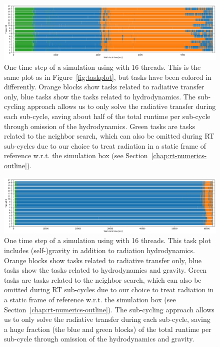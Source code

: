 \begin{figure}
 \centering
 \includegraphics[width=\textwidth]{figures/RHD/taskplot-rt-colored.png}%
 \caption{
One time step of a simulation using \swift with 16 threads. This is the same plot as in
Figure~\ref{fig:taskplot}, but tasks have been colored in differently. Orange blocks show tasks
related to radiative transfer only, blue tasks show the tasks related to hydrodynamics. The
sub-cycling approach allows us to only solve the radiative transfer during each sub-cycle, saving
about half of the total runtime per sub-cycle through omission of the hydrodynamics. Green tasks
are tasks related to the neighbor search, which can also be omitted during RT sub-cycles due to our
choice to treat radiation in a static frame of reference w.r.t. the simulation box (see
Section~\ref{chap:rt-numerics-outline}).
 }
 \label{fig:taskplot-rt-marked}
\end{figure}


\begin{figure}
 \centering
 \includegraphics[width=\textwidth]{figures/RHD/taskplot-rt-colored-gravity.png}%
 \caption{
One time step of a simulation using \swift with 16 threads. This task plot includes (self-)gravity
in addition to radiation hydrodynamics. Orange blocks show tasks related to radiative transfer
only, blue tasks show the tasks related to hydrodynamics and gravity. Green tasks are tasks related
to the neighbor search, which can also be omitted during RT sub-cycles due to our choice to treat
radiation in a static frame of reference w.r.t. the simulation box (see
Section~\ref{chap:rt-numerics-outline}). The sub-cycling approach allows us to only solve the
radiative transfer during each sub-cycle, saving a huge fraction (the blue and green blocks) of the
total runtime per sub-cycle through omission of the hydrodynamics and gravity.
 }
 \label{fig:taskplot-rt-marked-gravity}
\end{figure}


